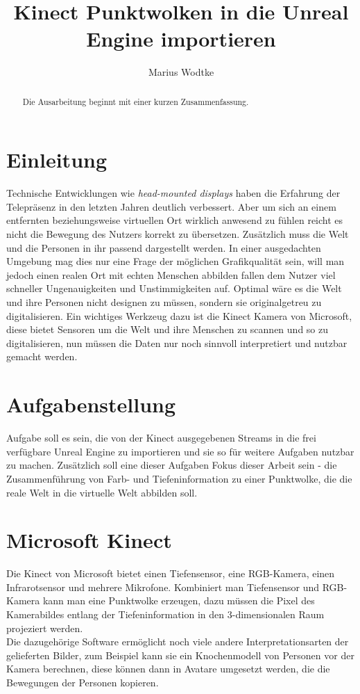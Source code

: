 \documentclass[a4paper]{IEEEtran}
\title{Kinect Punktwolken in die Unreal Engine importieren}
\author{Marius Wodtke}
\begin{document}
\maketitle

\begin{abstract}
Die Ausarbeitung beginnt mit einer kurzen Zusammenfassung.
\end{abstract}

\section{Einleitung}
Technische Entwicklungen wie {\textit{head-mounted displays}} haben die Erfahrung der Telepräsenz in den letzten Jahren deutlich verbessert. Aber um sich an einem entfernten beziehungsweise virtuellen Ort wirklich anwesend zu fühlen reicht es nicht die Bewegung des Nutzers korrekt zu übersetzen. Zusätzlich muss die Welt und die Personen in ihr passend dargestellt werden. In einer ausgedachten Umgebung mag dies nur eine Frage der möglichen Grafikqualität sein, will man jedoch einen realen Ort mit echten Menschen abbilden fallen dem Nutzer viel schneller Ungenauigkeiten und Unstimmigkeiten auf. Optimal wäre es die Welt und ihre Personen nicht designen zu müssen, sondern sie originalgetreu zu digitalisieren. Ein wichtiges Werkzeug dazu ist die Kinect Kamera von Microsoft, diese bietet Sensoren um die Welt und ihre Menschen zu scannen und so zu digitalisieren, nun müssen die Daten nur noch sinnvoll interpretiert und nutzbar gemacht werden.

\section{Aufgabenstellung}
Aufgabe soll es sein, die von der Kinect ausgegebenen Streams in die frei verfügbare Unreal Engine zu importieren und sie so für weitere Aufgaben nutzbar zu machen. Zusätzlich soll eine dieser Aufgaben Fokus dieser Arbeit sein - die Zusammenführung von Farb- und Tiefeninformation zu einer Punktwolke, die die reale Welt in die virtuelle Welt abbilden soll. 

\section{Microsoft Kinect}
Die Kinect von Microsoft bietet einen Tiefensensor, eine RGB-Kamera, einen Infrarotsensor und mehrere Mikrofone. Kombiniert man Tiefensensor und RGB-Kamera kann man eine Punktwolke erzeugen, dazu müssen die Pixel des Kamerabildes entlang der Tiefeninformation in den 3-dimensionalen Raum projeziert werden. \\
Die dazugehörige Software ermöglicht noch viele andere Interpretationsarten der gelieferten Bilder, zum Beispiel kann sie ein Knochenmodell von Personen vor der Kamera berechnen, diese können dann in Avatare umgesetzt werden, die die Bewegungen der Personen kopieren.
\end{document}
